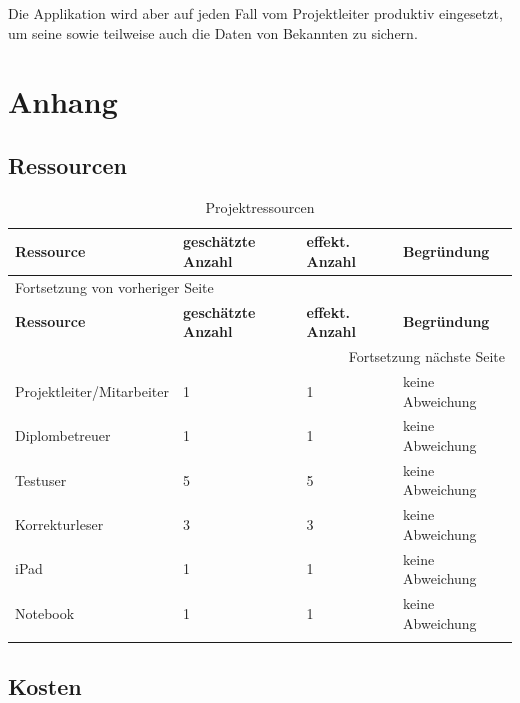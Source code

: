 Die Applikation wird aber auf jeden Fall vom Projektleiter produktiv eingesetzt,
um seine sowie teilweise auch die Daten von Bekannten zu sichern.

\section{Anhang}
\label{sec:orga97ab9e}

\subsection{Ressourcen}
\label{sec:org40d8cbc}

\begin{longtable}{|p{4cm}|p{2cm}|p{2cm}|p{4cm}|}
\hline
\textbf{Ressource}\cellcolor[HTML]{C0C0C0} & \textbf{geschätzte Anzahl}\cellcolor[HTML]{C0C0C0} & \textbf{effekt. Anzahl}\cellcolor[HTML]{C0C0C0} & \textbf{Begründung}\cellcolor[HTML]{C0C0C0}\\
\hline
\endfirsthead
\multicolumn{4}{l}{Fortsetzung von vorheriger Seite} \\
\hline

\textbf{Ressource}\cellcolor[HTML]{C0C0C0} & \textbf{geschätzte Anzahl}\cellcolor[HTML]{C0C0C0} & \textbf{effekt. Anzahl}\cellcolor[HTML]{C0C0C0} & \textbf{Begründung}\cellcolor[HTML]{C0C0C0} \\

\hline
\endhead
\hline\multicolumn{4}{r}{Fortsetzung nächste Seite} \\
\endfoot
\endlastfoot
\hline
Projektleiter/Mitarbeiter & 1 & 1 & keine Abweichung\\
Diplombetreuer & 1 & 1 & keine Abweichung\\
Testuser & 5 & 5 & keine Abweichung\\
Korrekturleser & 3 & 3 & keine Abweichung\\
iPad & 1 & 1 & keine Abweichung\\
Notebook & 1 & 1 & keine Abweichung\\
\hline
\caption{\label{tab:org0a7c4bd}
Projektressourcen}
\\
\end{longtable}

\subsection{Kosten}
\label{sec:orgb1cd490}

